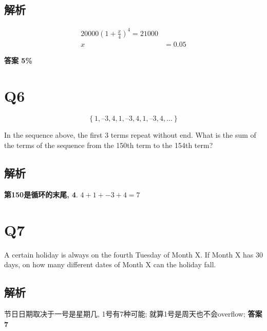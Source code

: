   \subsection{解析}

    \begin{align*}
      20000 \left( 1 + \frac{x}{4} \right)^{4} = 21000 \\
      x &= 0.05
    \end{align*}

    \textbf{答案 5\%}

\section{Q6}

  \begin{equation*}
    \left\{1, –3, 4, 1, –3, 4, 1, –3, 4, ...\right\}
  \end{equation*}

  In the sequence above, the first 3 terms repeat without end. What is the
  sum of the terms of the sequence from the 150th term to the 154th term?

  \subsection{解析}

    \textbf{第150是循环的末尾, 4}. $ 4 + 1 + -3 + 4 = 7 $

\section{Q7}

  A certain holiday is always on the fourth Tuesday of Month X. If Month
  X has 30 days, on how many different dates of Month X can the holiday fall.

  \subsection{解析}

    节日日期取决于一号是星期几, 1号有7种可能; 就算1号是周天也不会overflow;
    \textbf{答案 7}
